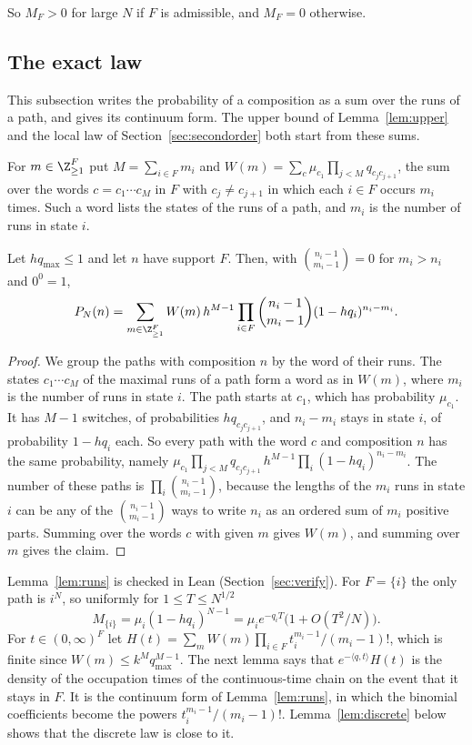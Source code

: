 So $M_F>0$ for large $N$ if $F$ is admissible, and $M_F=0$ otherwise.

\subsection{The exact law}

This subsection writes the probability of a composition as a sum over the runs of a path, and
gives its continuum form. The upper bound of Lemma~\ref{lem:upper} and the local law of
Section~\ref{sec:secondorder} both start from these sums.

For $m\in\Z_{\ge1}^F$ put $M=\sum_{i\in F}m_i$ and
$W(m)=\sum_c\mu_{c_1}\prod_{j<M}q_{c_jc_{j+1}}$, the sum over the words
$c=c_1\cdots c_M$ in $F$ with $c_j\ne c_{j+1}$ in which each $i\in F$ occurs
$m_i$ times. Such a word lists the states of the runs of a path, and $m_i$ is
the number of runs in state $i$.

\begin{lemma}\label{lem:runs}
Let $hq_{\max}\le1$ and let $n$ have support $F$. Then, with
$\binom{n_i-1}{m_i-1}=0$ for $m_i>n_i$ and $0^0=1$,
\[
P_N(n)=\sum_{m\in\Z_{\ge1}^F}W(m)\,h^{M-1}\prod_{i\in F}\binom{n_i-1}{m_i-1}
(1-hq_i)^{n_i-m_i}.
\]
\end{lemma}

\begin{proof}
We group the paths with composition $n$ by the word of their runs. The states
$c_1\cdots c_M$ of the maximal runs of a path form a word as in $W(m)$, where
$m_i$ is the number of runs in state $i$. The path starts at $c_1$, which has
probability $\mu_{c_1}$. It has $M-1$ switches, of probabilities
$hq_{c_jc_{j+1}}$, and $n_i-m_i$ stays in state $i$, of probability $1-hq_i$
each. So every path with the word $c$ and composition $n$ has the same
probability, namely
$\mu_{c_1}\prod_{j<M}q_{c_jc_{j+1}}\,h^{M-1}\prod_i(1-hq_i)^{n_i-m_i}$. The
number of these paths is $\prod_i\binom{n_i-1}{m_i-1}$, because the lengths of
the $m_i$ runs in state $i$ can be any of the $\binom{n_i-1}{m_i-1}$ ways to
write $n_i$ as an ordered sum of $m_i$ positive parts. Summing over the words
$c$ with given $m$ gives $W(m)$, and summing over $m$ gives the claim.
\end{proof}

Lemma~\ref{lem:runs} is checked in Lean (Section~\ref{sec:verify}). For
$F=\{i\}$ the only path is $i^N$, so uniformly for $1\le T\le N^{1/2}$
\begin{equation}\label{eq:vertexmax}
M_{\{i\}}=\mu_i(1-hq_i)^{N-1}=\mu_ie^{-q_iT}\bigl(1+O(T^2/N)\bigr).
\end{equation}
For $t\in(0,\infty)^F$ let $H(t)=\sum_mW(m)\prod_{i\in F}t_i^{m_i-1}/(m_i-1)!$,
which is finite since $W(m)\le k^Mq_{\max}^{M-1}$. The next lemma says that
$e^{-\langle q,t\rangle}H(t)$ is the density of the occupation times of the
continuous-time chain on the event that it stays in $F$. It is the continuum
form of Lemma~\ref{lem:runs}, in which the binomial coefficients become the
powers $t_i^{m_i-1}/(m_i-1)!$. Lemma~\ref{lem:discrete} below shows that the
discrete law is close to it.

